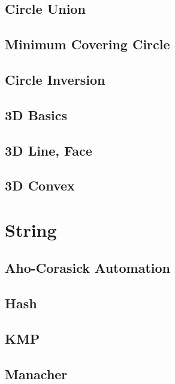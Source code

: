 \subsection{Circle Union}
\raggedbottom
\hrulefill
\subsection{Minimum Covering Circle}
\raggedbottom
\hrulefill
\subsection{Circle Inversion}
\raggedbottom
\hrulefill
\subsection{3D Basics}
\raggedbottom
\hrulefill
\subsection{3D Line, Face}
\raggedbottom
\hrulefill
\subsection{3D Convex}
\raggedbottom
\hrulefill

\section{String}
\subsection{Aho-Corasick Automation}
\raggedbottom
\hrulefill
\subsection{Hash}
\raggedbottom
\hrulefill
\subsection{KMP}
\raggedbottom
\hrulefill
\subsection{Manacher}
\raggedbottom
\hrulefill
